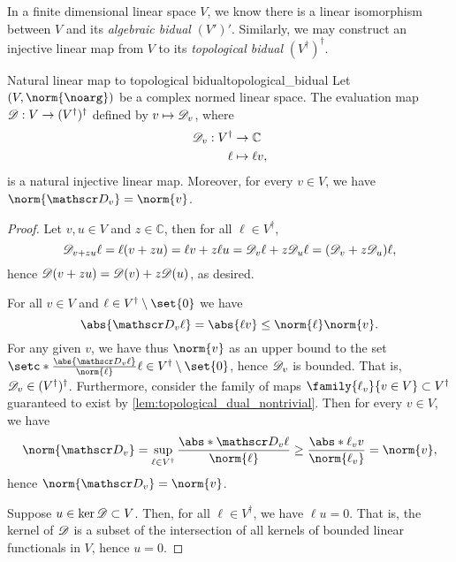In a finite dimensional linear space \(V\), we know there is a linear isomorphism between \(V\) and its \emph{algebraic bidual} \((V')'\). Similarly, we may construct an injective linear map from \(V\) to its \emph{topological bidual} \((V^\dag)^\dag\).
\begin{proposition}{Natural linear map to topological bidual}{topological_bidual}
    Let \((V, \norm{\noarg})\) be a complex normed linear space. The evaluation map \(\mathscr{D} : V \to (V^\dag)^\dag\) defined by \(v\mapsto \mathscr{D}_v\), where
    \begin{align*}
        \mathscr{D}_v : V^\dag &\to \mathbb{C}\\
                          \ell &\mapsto \ell v,
    \end{align*}
    is a natural injective linear map. Moreover, for every \(v \in V\), we have \(\norm{\eval_v} = \norm{v}\).
\end{proposition}
\begin{proof}
    Let \(v, u \in V\) and \(z \in \mathbb{C}\), then for all \(\ell \in V^\dag\),
    \begin{equation*}
        \mathscr{D}_{v + zu}\ell = \ell(v + zu) = \ell v + z \ell u = \mathscr{D}_v \ell + z \mathscr{D}_{u} \ell = (\mathscr{D}_v + z \mathscr{D}_u) \ell,
    \end{equation*}
    hence \(\mathscr{D}(v + zu) = \mathscr{D}(v) + z\mathscr{D}(u)\), as desired.

    For all \(v \in V\) and \(\ell \in V^\dag \setminus\set{0}\) we have
    \begin{equation*}
        \abs{\eval_v\ell} = \abs{\ell v} \leq \norm{\ell} \norm{v}.
    \end{equation*}
    For any given \(v\), we have thus \(\norm{v}\) as an upper bound to the set \(\setc*{\frac{\abs{\eval_v\ell}}{\norm{\ell}}}{\ell \in V^\dag\setminus\set{0}}\), hence \(\mathscr{D}_v\) is bounded. That is, \(\mathscr{D}_v \in (V^\dag)^\dag\). Furthermore, consider the family of maps \(\family{\ell_v}{v \in V} \subset V^\dag\) guaranteed to exist by \cref{lem:topological_dual_nontrivial}. Then for every \(v \in V\), we have
    \begin{equation*}
        \norm{\eval_v} = \sup_{\ell \in V^\dag} \frac{\abs*{\eval_v\ell}}{\norm{\ell}} \geq \frac{\abs*{\ell_vv}}{\norm{\ell_v}} = \norm{v},
    \end{equation*}
    hence \(\norm{\eval_v} = \norm{v}\).

    Suppose \(u \in \ker{\mathscr{D}} \subset V\). Then, for all \(\ell \in V^\dag\), we have \(\ell u = 0\). That is, the kernel of \(\mathscr{D}\) is a subset of the intersection of all kernels of bounded linear functionals in \(V\), hence \(u = 0\).
\end{proof}



